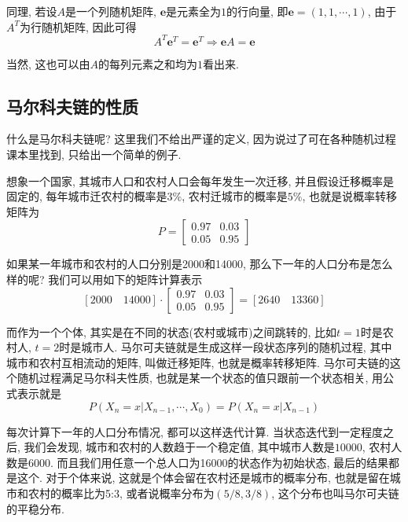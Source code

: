 \documentclass[a4paper,UTF8]{ctexart}
\theoremstyle{plain} \newtheorem{theorem}{定理}[section]
\theoremstyle{plain} \newtheorem{definition}{定义}[section]
\theoremstyle{plain} \newtheorem{lemma}{引理}[section]
\theoremstyle{plain} \newtheorem{proposition}{命题}[section]
\theoremstyle{plain} \newtheorem{example}{例}[section]
\theoremstyle{plain} \newtheorem{remark}{注}[section]
\theoremstyle{plain} \newtheorem{corollary}{推论}[section]
\begin{document}
同理, 若设$A$是一个列随机矩阵, $\bm{e}$是元素全为$1$的行向量, 即$\bm{e} = (1, 1, \cdots, 1)$, 由于$A^{T}$为行随机矩阵, 因此可得
\begin{equation*}
A^{T} \bm{e}^{T} = \bm{e}^{T} \Rightarrow \bm{e} A = \bm{e}
\end{equation*}

当然, 这也可以由$A$的每列元素之和均为$1$看出来.

\subsection{马尔科夫链的性质}
什么是马尔科夫链呢? 这里我们不给出严谨的定义, 因为说过了可在各种随机过程课本里找到, 只给出一个简单的例子. 

想象一个国家, 其城市人口和农村人口会每年发生一次迁移, 并且假设迁移概率是固定的, 每年城市迁农村的概率是$3 \%$, 农村迁城市的概率是$5 \%$, 也就是说概率转移矩阵为
$$
P = 
\begin{bmatrix}
0.97 & 0.03 \\ 
0.05 & 0.95
\end{bmatrix}
$$

如果某一年城市和农村的人口分别是2000和14000, 那么下一年的人口分布是怎么样的呢? 我们可以用如下的矩阵计算表示
$$
[2000 \quad 14000] \cdot 
\begin{bmatrix}
0.97 & 0.03 \\ 
0.05 & 0.95
\end{bmatrix}
= [2640 \quad 13360]
$$

而作为一个个体, 其实是在不同的状态(农村或城市)之间跳转的, 比如$t=1$时是农村人, $t=2$时是城市人. 马尔可夫链就是生成这样一段状态序列的随机过程, 其中城市和农村互相流动的矩阵, 叫做迁移矩阵, 也就是概率转移矩阵. 马尔可夫链的这个随机过程满足马尔科夫性质, 也就是某一个状态的值只跟前一个状态相关, 用公式表示就是
\begin{equation*}
P(X_n = x | X_{n-1}, \cdots, X_0) = P(X_n = x | X_{n-1})
\end{equation*}

每次计算下一年的人口分布情况, 都可以这样迭代计算. 当状态迭代到一定程度之后, 我们会发现, 城市和农村的人数趋于一个稳定值, 其中城市人数是$10000$, 农村人数是$6000$. 而且我们用任意一个总人口为16000的状态作为初始状态, 最后的结果都是这个. 对于个体来说, 这就是个体会留在农村还是城市的概率分布, 也就是留在城市和农村的概率比为5:3, 或者说概率分布为$(5/8, 3/8)$, 这个分布也叫马尔可夫链的平稳分布.
\end{document}
